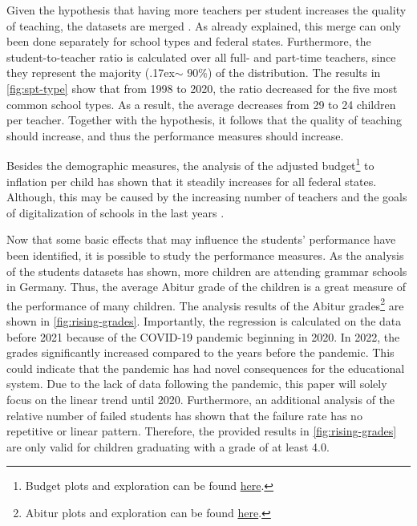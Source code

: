 Given the hypothesis that having more teachers per student increases the quality of teaching, the datasets are merged \cite{kasau_onesmus_mulei_pupil-teacher_2016,koc_impact_2015}. As already explained, this merge can only been done separately for school types and federal states. Furthermore, the student-to-teacher ratio is calculated over all full- and part-time teachers, since they represent the majority ({\raise.17ex\hbox{$\scriptstyle\mathtt{\sim}$}} $90\%$) of the distribution. The results in \autoref{fig:spt-type} show that from 1998 to 2020, the ratio decreased for the five most common school types. As a result, the average decreases from 29 to 24 children per teacher. Together with the hypothesis, it follows that the quality of teaching should increase, and thus the performance measures should increase.

Besides the demographic measures, the analysis of the adjusted budget\footnote{\label{footnote:budget}Budget plots and exploration can be found \href{https://github.com/KarylReyne/DataLiteracyWS23/blob/main/exp/TF-007-SchoolBudgets.ipynb}{here}.} to inflation per child has shown that it steadily increases for all federal states. Although, this may be caused by the increasing number of teachers and the goals of digitalization of schools in the last years \cite{cone_pandemic_2022}.

Now that some basic effects that may influence the students' performance have been identified, it is possible to study the performance measures. As the analysis of the students datasets has shown, more children are attending grammar schools in Germany. Thus, the average Abitur grade of the children is a great measure of the performance of many children. The analysis results of the Abitur grades\footnote{\label{footnote:abi}Abitur plots and exploration can be found \href{https://github.com/KarylReyne/DataLiteracyWS23/blob/main/exp/TF-001-ExploreABIGrades.ipynb}{here}.} are shown in \autoref{fig:rising-grades}. Importantly, the regression is calculated on the data before 2021 because of the COVID-19 pandemic beginning in 2020. In 2022, the grades significantly increased compared to the years before the pandemic. This could indicate that the pandemic has had novel consequences for the educational system. Due to the lack of data following the pandemic, this paper will solely focus on the linear trend until 2020. Furthermore, an additional analysis of the relative number of failed students has shown that the failure rate has no repetitive or linear pattern. Therefore, the provided results in \autoref{fig:rising-grades} are only valid for children graduating with a grade of at least 4.0.

